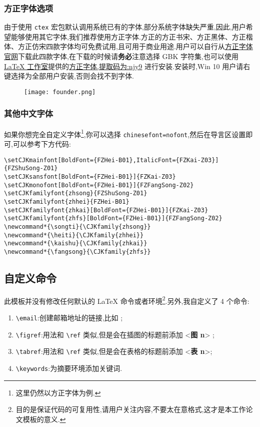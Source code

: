 \documentclass[lang=cn,a4paper]{elegantpaper}
\begin{document}
\subsubsection{方正字体选项}
由于使用 \lstinline{ctex} 宏包默认调用系统已有的字体,部分系统字体缺失严重,因此,用户希望能够使用其它字体,我们推荐使用方正字体.方正的{\songti 方正书宋}、{\heiti 方正黑体}、{\kaishu 方正楷体}、{\fangsong 方正仿宋}四款字体均可免费试用,且可用于商业用途.用户可以自行从\href{http://www.foundertype.com/}{方正字体官网}下载此四款字体,在下载的时候请\textbf{务必}注意选择 GBK 字符集,也可以使用 \href{https://www.latexstudio.net/}{\LaTeX{} 工作室}提供的\href{https://pan.baidu.com/s/1BgbQM7LoinY7m8yeP25Y7Q}{方正字体,提取码为:njy9} 进行安装.安装时,{\kaishu Win 10 用户请右键选择为全部用户安装,否则会找不到字体.}

\begin{figure}[!htb]
\centering
\texttt{[image: founder.png]}
\end{figure}

\subsubsection{其他中文字体}
如果你想完全自定义字体\footnote{这里仍然以方正字体为例.},你可以选择 \lstinline{chinesefont=nofont},然后在导言区设置即可,可以参考下方代码:
\begin{lstlisting}
\setCJKmainfont[BoldFont={FZHei-B01},ItalicFont={FZKai-Z03}]{FZShuSong-Z01}
\setCJKsansfont[BoldFont={FZHei-B01}]{FZKai-Z03}
\setCJKmonofont[BoldFont={FZHei-B01}]{FZFangSong-Z02}
\setCJKfamilyfont{zhsong}{FZShuSong-Z01}
\setCJKfamilyfont{zhhei}{FZHei-B01}
\setCJKfamilyfont{zhkai}[BoldFont={FZHei-B01}]{FZKai-Z03}
\setCJKfamilyfont{zhfs}[BoldFont={FZHei-B01}]{FZFangSong-Z02}
\newcommand*{\songti}{\CJKfamily{zhsong}}
\newcommand*{\heiti}{\CJKfamily{zhhei}}
\newcommand*{\kaishu}{\CJKfamily{zhkai}}
\newcommand*{\fangsong}{\CJKfamily{zhfs}}
\end{lstlisting}



\subsection{自定义命令}
此模板并没有修改任何默认的 \LaTeX{} 命令或者环境\footnote{目的是保证代码的可复用性,请用户关注内容,不要太在意格式,这才是本工作论文模板的意义.}.另外,我自定义了 4 个命令:
\begin{enumerate}
  \item \lstinline{\email}:创建邮箱地址的链接,比如 ;
  \item \lstinline{\figref}:用法和 \lstinline{\ref} 类似,但是会在插图的标题前添加 <\textbf{图 n}> ;
  \item \lstinline{\tabref}:用法和 \lstinline{\ref} 类似,但是会在表格的标题前添加 <\textbf{表 n}>;
  \item \lstinline{\keywords}:为摘要环境添加关键词.
\end{enumerate}
\end{document}
